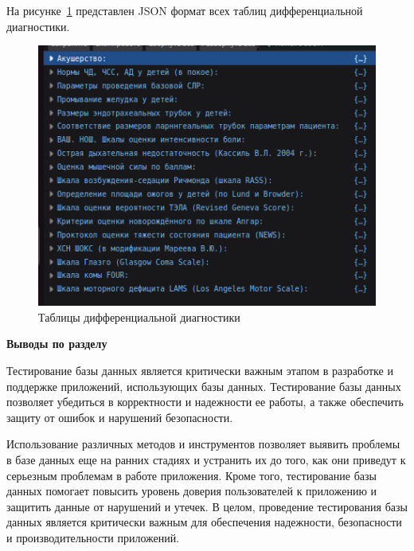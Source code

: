 На рисунке~\ref{fig:fig29} представлен JSON формат всех таблиц дифференциальной диагностики.

\begin{figure}
  \includegraphics[scale=1]{inc/sh_all_tables}
  \caption{Таблицы дифференциальной диагностики}
  \label{fig:fig29}
\end{figure}



\bigbreak
\textbf{Выводы по разделу}
\bigbreak

Тестирование базы данных является критически важным этапом в разработке и поддержке приложений, использующих базы данных. Тестирование базы данных позволяет убедиться в корректности и надежности ее работы, а также обеспечить защиту от ошибок и нарушений безопасности.

Использование различных методов и инструментов позволяет выявить проблемы в базе данных еще на ранних стадиях и устранить их до того, как они приведут к серьезным проблемам в работе приложения. Кроме того, тестирование базы данных помогает повысить уровень доверия пользователей к приложению и защитить данные от нарушений и утечек. В целом, проведение тестирования базы данных является критически важным для обеспечения надежности, безопасности и производительности приложений.